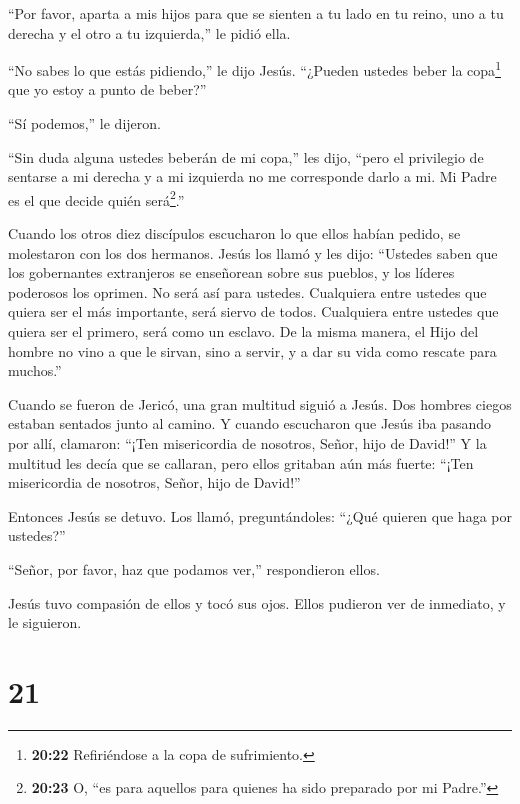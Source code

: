 ``Por favor, aparta a mis hijos para que se sienten a tu lado en tu
reino, uno a tu derecha y el otro a tu izquierda,'' le pidió ella.

 ``No sabes lo que estás pidiendo,'' le dijo Jesús.
``¿Pueden ustedes beber la copa\footnote{\textbf{20:22} Refiriéndose a
  la copa de sufrimiento.} que yo estoy a punto de beber?''

``Sí podemos,'' le dijeron.

 ``Sin duda alguna ustedes beberán de mi copa,'' les dijo,
``pero el privilegio de sentarse a mi derecha y a mi izquierda no me
corresponde darlo a mi. Mi Padre es el que decide quién
será\footnote{\textbf{20:23} O, ``es para aquellos para quienes ha sido
  preparado por mi Padre.''}.''

 Cuando los otros diez discípulos escucharon lo que ellos
habían pedido, se molestaron con los dos hermanos.  Jesús
los llamó y les dijo: ``Ustedes saben que los gobernantes extranjeros se
enseñorean sobre sus pueblos, y los líderes poderosos los oprimen.
 No será así para ustedes. Cualquiera entre ustedes que
quiera ser el más importante, será siervo de todos. 
Cualquiera entre ustedes que quiera ser el primero, será como un
esclavo.  De la misma manera, el Hijo del hombre no vino a
que le sirvan, sino a servir, y a dar su vida como rescate para
muchos.''

 Cuando se fueron de Jericó, una gran multitud siguió a
Jesús.  Dos hombres ciegos estaban sentados junto al
camino. Y cuando escucharon que Jesús iba pasando por allí, clamaron:
``¡Ten misericordia de nosotros, Señor, hijo de David!''  Y
la multitud les decía que se callaran, pero ellos gritaban aún más
fuerte: ``¡Ten misericordia de nosotros, Señor, hijo de David!''

 Entonces Jesús se detuvo. Los llamó, preguntándoles:
``¿Qué quieren que haga por ustedes?''

 ``Señor, por favor, haz que podamos ver,'' respondieron
ellos.

 Jesús tuvo compasión de ellos y tocó sus ojos. Ellos
pudieron ver de inmediato, y le siguieron.

\hypertarget{section-20}{%
\section{21}\label{section-20}}

